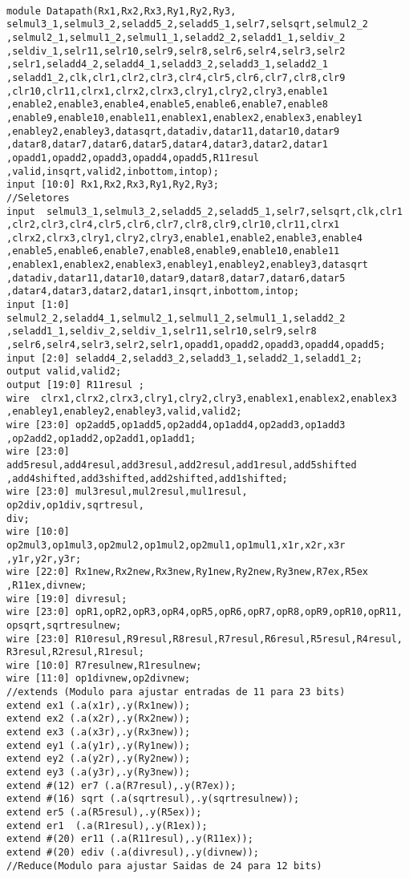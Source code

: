 \begin{lstlisting}[style={verilog-style}]

module Datapath(Rx1,Rx2,Rx3,Ry1,Ry2,Ry3,
selmul3_1,selmul3_2,seladd5_2,seladd5_1,selr7,selsqrt,selmul2_2
,selmul2_1,selmul1_2,selmul1_1,seladd2_2,seladd1_1,seldiv_2
,seldiv_1,selr11,selr10,selr9,selr8,selr6,selr4,selr3,selr2
,selr1,seladd4_2,seladd4_1,seladd3_2,seladd3_1,seladd2_1
,seladd1_2,clk,clr1,clr2,clr3,clr4,clr5,clr6,clr7,clr8,clr9
,clr10,clr11,clrx1,clrx2,clrx3,clry1,clry2,clry3,enable1
,enable2,enable3,enable4,enable5,enable6,enable7,enable8
,enable9,enable10,enable11,enablex1,enablex2,enablex3,enabley1
,enabley2,enabley3,datasqrt,datadiv,datar11,datar10,datar9
,datar8,datar7,datar6,datar5,datar4,datar3,datar2,datar1
,opadd1,opadd2,opadd3,opadd4,opadd5,R11resul
,valid,insqrt,valid2,inbottom,intop);
input [10:0] Rx1,Rx2,Rx3,Ry1,Ry2,Ry3;
//Seletores
input  selmul3_1,selmul3_2,seladd5_2,seladd5_1,selr7,selsqrt,clk,clr1
,clr2,clr3,clr4,clr5,clr6,clr7,clr8,clr9,clr10,clr11,clrx1
,clrx2,clrx3,clry1,clry2,clry3,enable1,enable2,enable3,enable4
,enable5,enable6,enable7,enable8,enable9,enable10,enable11
,enablex1,enablex2,enablex3,enabley1,enabley2,enabley3,datasqrt
,datadiv,datar11,datar10,datar9,datar8,datar7,datar6,datar5
,datar4,datar3,datar2,datar1,insqrt,inbottom,intop;
input [1:0] selmul2_2,seladd4_1,selmul2_1,selmul1_2,selmul1_1,seladd2_2
,seladd1_1,seldiv_2,seldiv_1,selr11,selr10,selr9,selr8
,selr6,selr4,selr3,selr2,selr1,opadd1,opadd2,opadd3,opadd4,opadd5;
input [2:0] seladd4_2,seladd3_2,seladd3_1,seladd2_1,seladd1_2; 
output valid,valid2;
output [19:0] R11resul ;
wire  clrx1,clrx2,clrx3,clry1,clry2,clry3,enablex1,enablex2,enablex3
,enabley1,enabley2,enabley3,valid,valid2;
wire [23:0] op2add5,op1add5,op2add4,op1add4,op2add3,op1add3
,op2add2,op1add2,op2add1,op1add1;
wire [23:0] add5resul,add4resul,add3resul,add2resul,add1resul,add5shifted
,add4shifted,add3shifted,add2shifted,add1shifted;
wire [23:0] mul3resul,mul2resul,mul1resul,
op2div,op1div,sqrtresul,
div;
wire [10:0] op2mul3,op1mul3,op2mul2,op1mul2,op2mul1,op1mul1,x1r,x2r,x3r
,y1r,y2r,y3r;
wire [22:0] Rx1new,Rx2new,Rx3new,Ry1new,Ry2new,Ry3new,R7ex,R5ex
,R11ex,divnew;
wire [19:0] divresul;
wire [23:0] opR1,opR2,opR3,opR4,opR5,opR6,opR7,opR8,opR9,opR10,opR11,
opsqrt,sqrtresulnew;
wire [23:0] R10resul,R9resul,R8resul,R7resul,R6resul,R5resul,R4resul,
R3resul,R2resul,R1resul;
wire [10:0] R7resulnew,R1resulnew;
wire [11:0] op1divnew,op2divnew;
//extends (Modulo para ajustar entradas de 11 para 23 bits)
extend ex1 (.a(x1r),.y(Rx1new));
extend ex2 (.a(x2r),.y(Rx2new));
extend ex3 (.a(x3r),.y(Rx3new));
extend ey1 (.a(y1r),.y(Ry1new));
extend ey2 (.a(y2r),.y(Ry2new));
extend ey3 (.a(y3r),.y(Ry3new));
extend #(12) er7 (.a(R7resul),.y(R7ex));
extend #(16) sqrt (.a(sqrtresul),.y(sqrtresulnew));
extend er5 (.a(R5resul),.y(R5ex));
extend er1  (.a(R1resul),.y(R1ex));
extend #(20) er11 (.a(R11resul),.y(R11ex));
extend #(20) ediv (.a(divresul),.y(divnew));
//Reduce(Modulo para ajustar Saidas de 24 para 12 bits)


\end{lstlisting}

